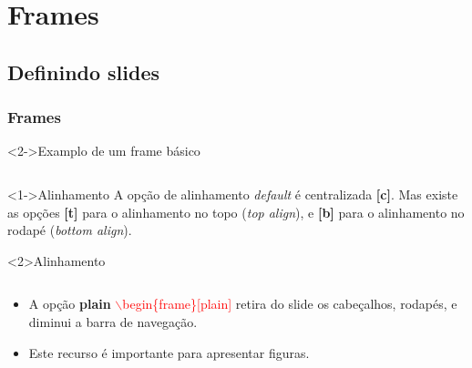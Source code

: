 \section{Frames}
\subsection{Definindo slides}

\begin{frame}
  \frametitle{Frames}


  \vspace{1cm}

  \begin{block}<2->{Examplo de um frame básico}
    \inputminted[fontsize=\scriptsize]{tex}{codes/01-frame.tex}
  \end{block}

\end{frame}


\begin{frame}

  \begin{block}<1->{Alinhamento}
    A opção de alinhamento \textit{default} é centralizada \textbf{[c]}.
    Mas existe as opções \textbf{[t]} para o alinhamento no topo (\textit{top align}), e \textbf{[b]} para
    o alinhamento no rodapé (\textit{bottom align}).
  \end{block}

  \vspace{1cm}

  \begin{block}<2>{Alinhamento}
    \inputminted[fontsize=\scriptsize]{tex}{codes/02-frame.tex}
  \end{block}
\end{frame}


\begin{frame}[plain]
  \begin{itemize}[<+->]
     \item A opção \textbf{plain} \textcolor{red}{$\backslash$begin\{frame\}[plain]}
           retira do slide os cabeçalhos, rodapés, e diminui a barra de navegação.
     \item Este recurso é importante para apresentar figuras.
  \end{itemize}
\end{frame}

